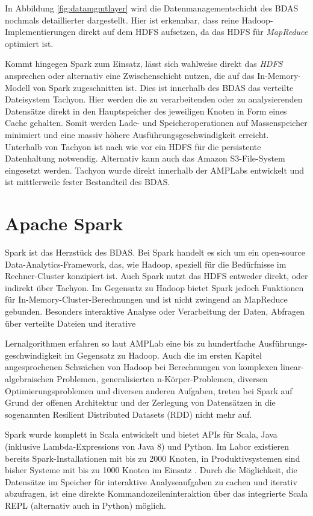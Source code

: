  

In Abbildung \ref{fig:datamgmtlayer} wird die Datenmanagementschicht des BDAS nochmals detaillierter dargestellt. Hier ist erkennbar, dass reine Hadoop-Implementierungen direkt auf dem HDFS aufsetzen, da das HDFS für \textit{MapReduce} optimiert ist. 

Kommt hingegen Spark zum Einsatz, lässt sich wahlweise direkt das \textit{HDFS} ansprechen oder alternativ eine Zwischenschicht nutzen, die auf das In-Memory-Modell von Spark zugeschnitten ist. Dies ist innerhalb des BDAS das verteilte Dateisystem Tachyon. Hier werden die zu verarbeitenden oder zu analysierenden Datensätze direkt in den Hauptspeicher des jeweiligen Knoten in Form eines Cache gehalten. Somit werden Lade- und Speicheroperationen auf Massenspeicher minimiert und eine massiv höhere Ausführungsgeschwindigkeit erreicht. Unterhalb von Tachyon ist nach wie vor ein HDFS für die persistente Datenhaltung notwendig. Alternativ kann auch das Amazon S3-File-System eingesetzt werden. Tachyon wurde direkt innerhalb der AMPLabs entwickelt und ist mittlerweile fester Bestandteil des BDAS.  


\section{Apache Spark}
\label{section:apache Spark}

Spark ist das Herzstück des BDAS. Bei Spark handelt es sich um ein open-source Data-Analytics-Framework, das, wie Hadoop, speziell für die Bedürfnisse im Rechner-Cluster konzipiert ist. Auch Spark nutzt das HDFS entweder direkt, oder indirekt über Tachyon. Im Gegensatz zu Hadoop bietet Spark jedoch Funktionen für In-Memory-Cluster-Berechnungen und ist nicht zwingend an MapReduce gebunden. Besonders interaktive Analyse oder Verarbeitung der Daten, Abfragen über verteilte Dateien und iterative 

Lernalgorithmen erfahren so laut AMPLab eine bis zu hundertfache Ausführungs-geschwindigkeit im Gegensatz zu Hadoop. Auch die im ersten Kapitel angesprochenen Schwächen von Hadoop bei Berechnungen von komplexen linear-algebraischen Problemen, generalisierten n-Körper-Problemen, diversen Optimierungsproblemen und diversen anderen Aufgaben, treten bei Spark auf Grund der offenen Architektur und der Zerlegung von Datensätzen in die sogenannten Resilient Distributed Datasets (RDD) nicht mehr auf.

Spark wurde komplett in Scala entwickelt und bietet APIs für Scala, Java (inklusive Lambda-Expressions von Java 8) und Python. Im Labor existieren bereits Spark-Installationen mit bis zu 2000 Knoten, in Produktivsystemen sind bisher Systeme mit bis zu 1000 Knoten im Einsatz . Durch die Möglichkeit, die Datensätze im Speicher für interaktive Analyseaufgaben zu cachen und iterativ abzufragen, ist eine direkte Kommandozeileninteraktion über das integrierte Scala REPL (alternativ auch in Python) möglich. 

